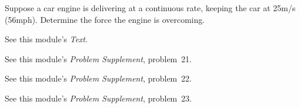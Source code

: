 {\begin{one-digit-list}
\item [4.] Suppose a car engine is delivering  at a
continuous rate, keeping the car at 25\unit{m/s} (56\unit{mph}).
Determine the force the engine is overcoming.
\end{one-digit-list}
\bigskip

\BriefAns

\begin{one-digit-list}
\item [1.] See this module's \textit{Text}.

\item [2.] See this module's \textit{Problem Supplement}, problem~21.

\item [3.] See this module's \textit{Problem Supplement}, problem~22.

\item [4.] See this module's \textit{Problem Supplement}, problem~23.
\end{one-digit-list}
}%
